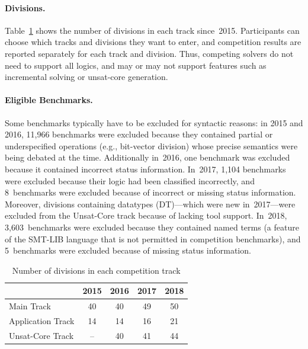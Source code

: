 \documentclass[dvipsnames,table,twoside,11pt]{article}
\newcommand{\maintrack}{Main Track\xspace}
\newcommand{\apptrack}{Application Track\xspace}
\newcommand{\ucoretrack}{Unsat-Core Track\xspace}
\begin{document}
\paragraph{Divisions.}
Table~\ref{table:divisions} shows the number of divisions in each
track since~2015.  Participants can choose which tracks and divisions
they want to enter, and competition results are reported separately
for each track and division.  Thus, competing solvers do not need to support
all logics, and may or may not support features such as incremental solving
or unsat-core generation.

\paragraph{Eligible Benchmarks.}
Some benchmarks typically have to be
excluded for syntactic reasons: in 2015 and 2016, 11,966 benchmarks
were excluded because they contained partial or underspecified
operations (e.g., bit-vector division) whose precise semantics were
being debated at the time.  Additionally in~2016, one benchmark was
excluded because it contained incorrect status information.  In~2017,
1,104 benchmarks were excluded because their logic had been classified
incorrectly, and 8~benchmarks were excluded because of incorrect or
missing status information.  Moreover, divisions containing datatypes
({DT})---which were new in~2017---were excluded from the Unsat-Core
track because of lacking tool support.  In~2018, 3,603~benchmarks were
excluded because they contained named terms (a feature of the SMT-LIB
language that is not permitted in competition benchmarks), and
5~benchmarks were excluded because of missing status information.

\begin{table}
  \caption{Number of divisions in each competition track}
  \label{table:divisions}
  \centering
  \begin{tabular}{lcccc}
    \toprule
    & 2015 & 2016 & 2017 & 2018 \\
    \midrule
    \maintrack   &  40 & 40 & 49 & 50 \\
    \apptrack    &  14 & 14 & 16 & 21 \\
    \ucoretrack  &  -- & 40 & 41 & 44 \\
    \bottomrule
  \end{tabular}
\end{table}
\end{document}
